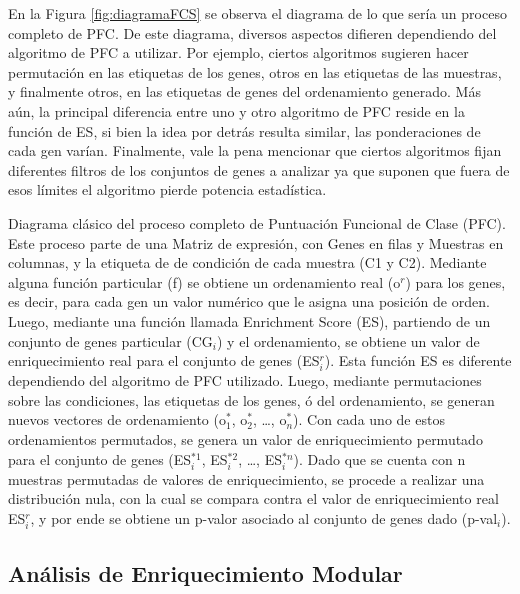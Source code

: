 \documentclass[12pt,twoside]{reedthesis}
\begin{document}
\par

En la Figura \ref{fig:diagramaFCS} se observa el diagrama de lo que sería un proceso completo de PFC. De este diagrama, diversos aspectos difieren dependiendo del algoritmo de PFC a utilizar. Por ejemplo, ciertos algoritmos sugieren hacer permutación en las etiquetas de los genes, otros en las etiquetas de las muestras, y finalmente otros, en las etiquetas de genes del ordenamiento generado. Más aún, la principal diferencia entre uno y otro algoritmo de PFC reside en la función de ES, si bien la idea por detrás resulta similar, las ponderaciones de cada gen varían. Finalmente, vale la pena mencionar que ciertos algoritmos fijan diferentes filtros de los conjuntos de genes a analizar ya que suponen que fuera de esos límites el algoritmo pierde potencia estadística.

Diagrama clásico del proceso completo de Puntuación Funcional de Clase (PFC). Este proceso parte de una Matriz de expresión, con Genes en filas y Muestras en columnas, y la etiqueta de de condición de cada muestra (C1 y C2). Mediante alguna función particular (f) se obtiene un ordenamiento real (o\(^r\)) para los genes, es decir, para cada gen un valor numérico que le asigna una posición de orden. Luego, mediante una función llamada Enrichment Score (ES), partiendo de un conjunto de genes particular (CG\(_i\)) y el ordenamiento, se obtiene un valor de enriquecimiento real para el conjunto de genes (ES\(^r_i\)). Esta función ES es diferente dependiendo del algoritmo de PFC utilizado. Luego, mediante permutaciones sobre las condiciones, las etiquetas de los genes, ó del ordenamiento, se generan nuevos vectores de ordenamiento (o\(^*_1\), o\(^*_2\), \ldots{}, o\(^*_n\)). Con cada uno de estos ordenamientos permutados, se genera un valor de enriquecimiento permutado para el conjunto de genes (ES\(^{*1}_i\), ES\(^{*2}_i\), \ldots{}, ES\(^{*n}_i\)). Dado que se cuenta con n muestras permutadas de valores de enriquecimiento, se procede a realizar una distribución nula, con la cual se compara contra el valor de enriquecimiento real ES\(^r_i\), y por ende se obtiene un p-valor asociado al conjunto de genes dado (p-val\(_i\)).



\hypertarget{anuxe1lisis-de-enriquecimiento-modular}{%
\subsection{Análisis de Enriquecimiento Modular}\label{anuxe1lisis-de-enriquecimiento-modular}}
\end{document}
